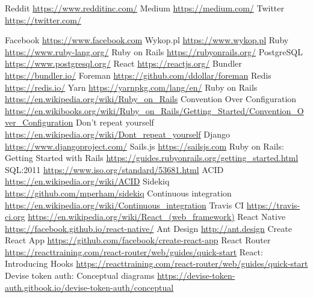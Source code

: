 \documentclass[declaration,shortabstract,polish,inz]{iithesis}
\begin{document}

\begin{thebibliography}{99}
 Reddit
\url{https://www.redditinc.com/}
 Medium
\url{https://medium.com/}
 Twitter
\url{https://twitter.com/}

 Facebook
\url{https://www.facebook.com}
 Wykop.pl 
\url{https://www.wykop.pl}
 Ruby
\url{https://www.ruby-lang.org/}
 Ruby on Rails
\url{https://rubyonrails.org/}
 PostgreSQL
\url{https://www.postgresql.org/}
 React
\url{https://reactjs.org/}
 Bundler
\url{https://bundler.io/}
 Foreman
\url{https://github.com/ddollar/foreman}
 Redis
\url{https://redis.io/}
 Yarn
\url{https://yarnpkg.com/lang/en/}
 Ruby on Rails
\url{https://en.wikipedia.org/wiki/Ruby_on_Rails}
 Convention Over Configuration
\url{https://en.wikibooks.org/wiki/Ruby_on_Rails/Getting_Started/Convention_Over_Configuration}
 Don't repeat yourself
\url{https://en.wikipedia.org/wiki/Dont_repeat_yourself}
 Django
\url{https://www.djangoproject.com/}
 Sails.js
\url{https://sailsjs.com}
 Ruby on Rails: 
Getting Started with Rails
\url{https://guides.rubyonrails.org/getting_started.html}
 SQL:2011 
\url{https://www.iso.org/standard/53681.html}
 ACID
\url{https://en.wikipedia.org/wiki/ACID}
 Sidekiq
\url{https://github.com/mperham/sidekiq}
 Continuous integration
\url{https://en.wikipedia.org/wiki/Continuous_integration}
 Travis CI
\url{https://travis-ci.org}
\url{https://en.wikipedia.org/wiki/React_(web_framework)}
 React Native
\url{https://facebook.github.io/react-native/}
 Ant Design
\url{http://ant.design}
 Create React App
\url{https://github.com/facebook/create-react-app}
 React Router
\url{https://reacttraining.com/react-router/web/guides/quick-start}
 React: Introducing Hooks
\url{https://reacttraining.com/react-router/web/guides/quick-start}
 Devise token auth: Conceptual diagrams
\url{https://devise-token-auth.gitbook.io/devise-token-auth/conceptual}

\end{thebibliography}
\end{document}
